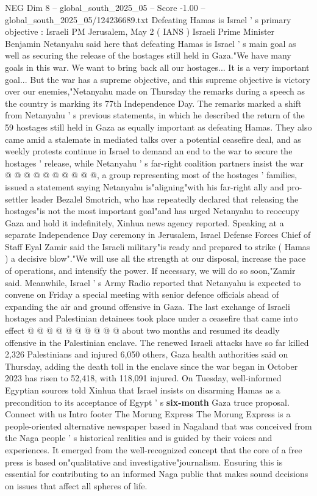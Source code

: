 \begin{textsample}{NEG Dim 8 – global\_south\_2025\_05 – Score -1.00 – global\_south\_2025\_05/124236689.txt}  \label{ex:f8_neg_314}
Defeating Hamas is Israel ' s primary objective : Israeli PM Jerusalem, May 2 ( IANS ) Israeli Prime Minister Benjamin Netanyahu said here that defeating Hamas is Israel ' s main goal as well as securing the release of the hostages still held in Gaza."We have many goals in this war.
We want to bring back all our hostages...
It is a very important goal...
But the war has a supreme objective, and this supreme objective is victory over our enemies,"Netanyahu made on Thursday the remarks during a speech as the country is marking its 77th Independence Day.
The remarks marked a shift from Netanyahu ' s previous statements, in which he described the return of the 59 hostages still held in Gaza as equally important as defeating Hamas.
They also came amid a stalemate in mediated talks over a potential ceasefire deal, and as weekly protests continue in Israel to demand an end to the war to secure the hostages ' release, while Netanyahu ' s far-right coalition partners insist the war @ @ @ @ @ @ @ @ @ @, a group representing most of the hostages ' families, issued a statement saying Netanyahu is"aligning"with his far-right ally and pro-settler leader Bezalel Smotrich, who has repeatedly declared that releasing the hostages"is not the most important goal"and has urged Netanyahu to reoccupy Gaza and hold it indefinitely, Xinhua news agency reported.
Speaking at a separate Independence Day ceremony in Jerusalem, Israel Defense Forces Chief of Staff Eyal Zamir said the Israeli military"is ready and prepared to strike ( Hamas ) a decisive blow"."We will use all the strength at our disposal, increase the pace of operations, and intensify the power.
If necessary, we will do so soon,"Zamir said.
Meanwhile, Israel ' s Army Radio reported that Netanyahu is expected to convene on Friday a special meeting with senior defence officials ahead of expanding the air and ground offensive in Gaza.
The last exchange of Israeli hostages and Palestinian detainees took place under a ceasefire that came into effect @ @ @ @ @ @ @ @ @ @ about two months and resumed its deadly offensive in the Palestinian enclave.
The renewed Israeli attacks have so far killed 2,326 Palestinians and injured 6,050 others, Gaza health authorities said on Thursday, adding the death toll in the enclave since the war began in October 2023 has risen to 52,418, with 118,091 injured.
On Tuesday, well-informed Egyptian sources told Xinhua that Israel insists on disarming Hamas as a precondition to its acceptance of Egypt ' s \textbf{six-month} Gaza truce proposal.
Connect with us Intro footer The Morung Express The Morung Express is a people-oriented alternative newspaper based in Nagaland that was conceived from the Naga people ' s historical realities and is guided by their voices and experiences.
It emerged from the well-recognized concept that the core of a free press is based on"qualitative and investigative"journalism.
Ensuring this is essential for contributing to an informed Naga public that makes sound decisions on issues that affect all spheres of life.

\end{textsample}
